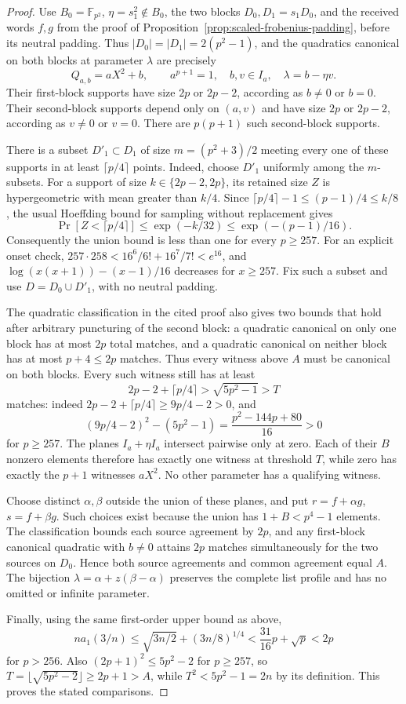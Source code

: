 \begin{proof}
Use $B_0=\mathbb F_{p^2}$, $\eta=s_1^2\notin B_0$, the two blocks
$D_0,D_1=s_1D_0$, and the received words $f,g$ from the proof of
Proposition~\ref{prop:scaled-frobenius-padding}, before its neutral
padding. Thus $|D_0|=|D_1|=2(p^2-1)$, and the quadratics canonical on
both blocks at parameter $\lambda$ are precisely
\[
 Q_{a,b}=aX^2+b,\qquad
 a^{p+1}=1,\quad b,v\in I_a,\quad\lambda=b-\eta v.
\]
Their first-block supports have size $2p$ or $2p-2$, according as
$b\ne0$ or $b=0$. Their second-block supports depend only on $(a,v)$
and have size $2p$ or $2p-2$, according as $v\ne0$ or $v=0$.
There are $p(p+1)$ such second-block supports.

There is a subset $D'_1\subset D_1$ of size
$m=(p^2+3)/2$ meeting every one of these supports in at least
$\lceil p/4\rceil$ points. Indeed, choose $D'_1$ uniformly among the
$m$-subsets. For a support of size $k\in\{2p-2,2p\}$, its retained
size $Z$ is hypergeometric with mean greater than $k/4$. Since
$\lceil p/4\rceil-1\le(p-1)/4\le k/8$, the usual Hoeffding bound
for sampling without replacement gives
\[
 \Pr[Z<\lceil p/4\rceil]\le \exp(-k/32)
 \le\exp(-(p-1)/16).
\]
Consequently the union bound is less than one for every $p\ge257$.
For an explicit onset check, $257\cdot258<16^6/6!+16^7/7!<e^{16}$,
and $\log(x(x+1))-(x-1)/16$ decreases for $x\ge257$.
Fix such a subset and use $D=D_0\cup D'_1$, with no neutral padding.

The quadratic classification in the cited proof also gives two bounds
that hold after arbitrary puncturing of the second block: a quadratic
canonical on only one block has at most $2p$ total matches, and a
quadratic canonical on neither block has at most $p+4\le2p$ matches.
Thus every witness above $A$ must be canonical on both blocks. Every
such witness still has at least
\[
 2p-2+\lceil p/4\rceil>\sqrt{5p^2-1}>T
\]
matches: indeed $2p-2+\lceil p/4\rceil\ge9p/4-2>0$, and
\[
 (9p/4-2)^2-(5p^2-1)=\frac{p^2-144p+80}{16}>0
\]
for $p\ge257$. The planes $I_a+\eta I_a$ intersect pairwise only at zero.
Each of their $B$ nonzero elements therefore has exactly one witness
at threshold $T$, while zero has exactly the $p+1$ witnesses $aX^2$.
No other parameter has a qualifying witness.

Choose distinct $\alpha,\beta$ outside the union of these planes, and
put $r=f+\alpha g$, $s=f+\beta g$. Such choices exist because the
union has $1+B<p^4-1$ elements. The classification bounds each source
agreement by $2p$, and any first-block canonical quadratic with
$b\ne0$ attains $2p$ matches simultaneously for the two sources on
$D_0$. Hence both source agreements and common agreement equal $A$.
The bijection $\lambda=\alpha+z(\beta-\alpha)$ preserves the complete
list profile and has no omitted or infinite parameter.

Finally, using the same first-order upper bound as above,
\[
 n a_1(3/n)\le\sqrt{3n/2}+(3n/8)^{1/4}
 <\frac{31}{16}p+\sqrt p<2p
\]
for $p>256$. Also $(2p+1)^2\le5p^2-2$ for $p\ge257$, so
$T=\lfloor\sqrt{5p^2-2}\rfloor\ge2p+1>A$, while
$T^2<5p^2-1=2n$ by its definition. This proves the stated comparisons.
\end{proof}

